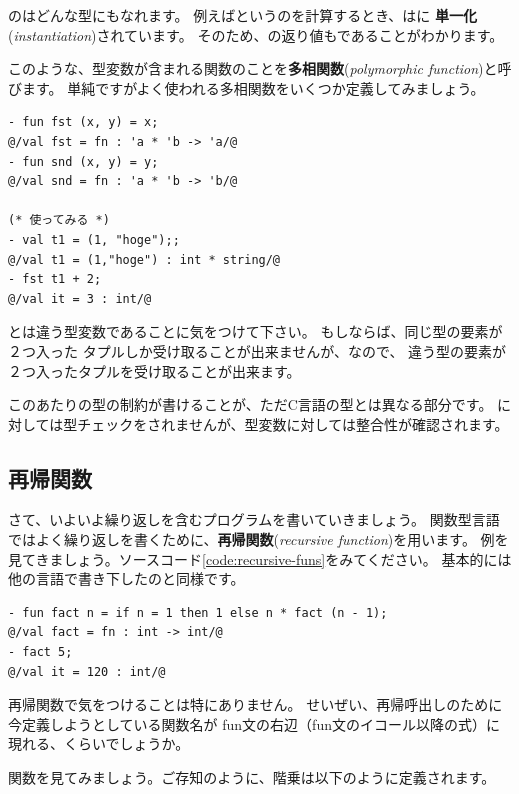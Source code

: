 \documentclass[11pt,a4paper]{jarticle}
\begin{document}
のはどんな型にもなれます。
例えばというのを計算するとき、はに
{\bfseries 単一化}({\itshape instantiation})されています。
そのため、の返り値もであることがわかります。

このような、型変数が含まれる関数のことを{\bfseries 多相関数}({\itshape polymorphic function})と呼びます。
単純ですがよく使われる多相関数をいくつか定義してみましょう。

\begin{lstlisting}[caption=多相関数たち,label=code:poly]
- fun fst (x, y) = x;
@/val fst = fn : 'a * 'b -> 'a/@
- fun snd (x, y) = y;
@/val snd = fn : 'a * 'b -> 'b/@

(* 使ってみる *)
- val t1 = (1, "hoge");;
@/val t1 = (1,"hoge") : int * string/@
- fst t1 + 2;
@/val it = 3 : int/@
\end{lstlisting}

とは違う型変数であることに気をつけて下さい。
もしならば、同じ型の要素が２つ入った
タプルしか受け取ることが出来ませんが、なので、
違う型の要素が２つ入ったタプルを受け取ることが出来ます。

このあたりの型の制約が書けることが、ただC言語の型とは異なる部分です。
に対しては型チェックをされませんが、型変数に対しては整合性が確認されます。

\subsection{再帰関数}

さて、いよいよ繰り返しを含むプログラムを書いていきましょう。
関数型言語ではよく繰り返しを書くために、{\bfseries 再帰関数}({\itshape recursive function})を用います。
例を見てきましょう。ソースコード\ref{code:recursive-funs}をみてください。
基本的には他の言語で書き下したのと同様です。

\begin{lstlisting}[caption=再帰関数,label=code:recursive-funs]
- fun fact n = if n = 1 then 1 else n * fact (n - 1);
@/val fact = fn : int -> int/@
- fact 5;
@/val it = 120 : int/@
\end{lstlisting}

再帰関数で気をつけることは特にありません。
せいぜい、再帰呼出しのために今定義しようとしている関数名が
fun文の右辺（fun文のイコール以降の式）に現れる、くらいでしょうか。

関数を見てみましょう。ご存知のように、階乗は以下のように定義されます。
\end{document}

